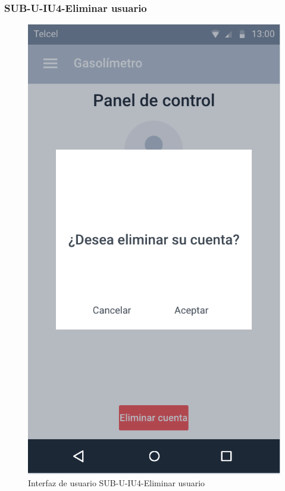 \subsubsection{SUB-U-IU4-Eliminar usuario}\label{SUB-U-IU1}
\begin{figure}[H]
	\centering
	\includegraphics[scale=.55]{Capitulo4/software/submodulos/usuarios/images/sub-u-iu4}
	\caption{Interfaz de usuario SUB-U-IU4-Eliminar usuario}
	\label{fig:sub-u-iu4}
\end{figure}